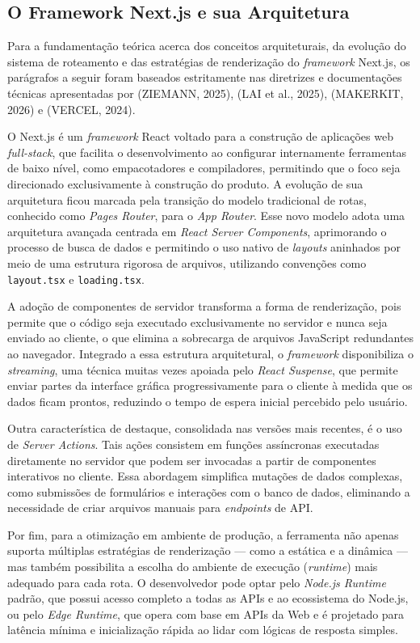 \subsection{O Framework Next.js e sua Arquitetura}

Para a fundamentação teórica acerca dos conceitos arquiteturais, da evolução do sistema de roteamento e das estratégias de renderização do \textit{framework} Next.js, os parágrafos a seguir foram baseados estritamente nas diretrizes e documentações técnicas apresentadas por (ZIEMANN, 2025), (LAI et al., 2025), (MAKERKIT, 2026) e (VERCEL, 2024).

O Next.js é um \textit{framework} React voltado para a construção de aplicações web \textit{full-stack}, que facilita o desenvolvimento ao configurar internamente ferramentas de baixo nível, como empacotadores e compiladores, permitindo que o foco seja direcionado exclusivamente à construção do produto. A evolução de sua arquitetura ficou marcada pela transição do modelo tradicional de rotas, conhecido como \textit{Pages Router}, para o \textit{App Router}. Esse novo modelo adota uma arquitetura avançada centrada em \textit{React Server Components}, aprimorando o processo de busca de dados e permitindo o uso nativo de \textit{layouts} aninhados por meio de uma estrutura rigorosa de arquivos, utilizando convenções como \texttt{layout.tsx} e \texttt{loading.tsx}.

A adoção de componentes de servidor transforma a forma de renderização, pois permite que o código seja executado exclusivamente no servidor e nunca seja enviado ao cliente, o que elimina a sobrecarga de arquivos JavaScript redundantes ao navegador. Integrado a essa estrutura arquitetural, o \textit{framework} disponibiliza o \textit{streaming}, uma técnica muitas vezes apoiada pelo \textit{React Suspense}, que permite enviar partes da interface gráfica progressivamente para o cliente à medida que os dados ficam prontos, reduzindo o tempo de espera inicial percebido pelo usuário.

Outra característica de destaque, consolidada nas versões mais recentes, é o uso de \textit{Server Actions}. Tais ações consistem em funções assíncronas executadas diretamente no servidor que podem ser invocadas a partir de componentes interativos no cliente. Essa abordagem simplifica mutações de dados complexas, como submissões de formulários e interações com o banco de dados, eliminando a necessidade de criar arquivos manuais para \textit{endpoints} de API.

Por fim, para a otimização em ambiente de produção, a ferramenta não apenas suporta múltiplas estratégias de renderização --- como a estática e a dinâmica --- mas também possibilita a escolha do ambiente de execução (\textit{runtime}) mais adequado para cada rota. O desenvolvedor pode optar pelo \textit{Node.js Runtime} padrão, que possui acesso completo a todas as APIs e ao ecossistema do Node.js, ou pelo \textit{Edge Runtime}, que opera com base em APIs da Web e é projetado para latência mínima e inicialização rápida ao lidar com lógicas de resposta simples.


